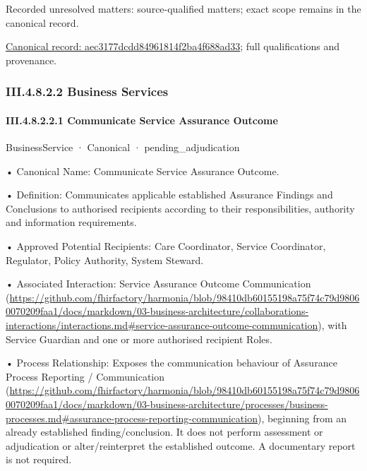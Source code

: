 {\small Recorded unresolved matters: source-qualified matters; exact scope remains in the canonical record.}\par
{\footnotesize \href{../../../../../../../../continuum/business/business-process/aec3177dcdd84961814f2ba4f688ad33.md}{Canonical record: aec3177dcdd84961814f2ba4f688ad33}; full qualifications and provenance.}\par
\subsubsection*{III.4.8.2.2 Business Services}
\label{navigation:III.4.8.2.2}

\paragraph*{III.4.8.2.2.1 Communicate Service Assurance Outcome}
\label{navigation:III.4.8.2.2.1}

\label{element:371b04d6bbf84b53a3c5667ae6df2809}
{\small BusinessService · Canonical · pending\_adjudication}\par

•
Canonical Name: Communicate Service Assurance Outcome.



•
Definition: Communicates applicable established Assurance Findings and Conclusions to authorised recipients according to their responsibilities, authority and information requirements.



•
Approved Potential Recipients: Care Coordinator, Service Coordinator, Regulator, Policy Authority, System Steward.



•
Associated Interaction: Service Assurance Outcome Communication (\url{https://github.com/fhirfactory/harmonia/blob/98410db60155198a75f74c79d98060070209faa1/docs/markdown/03-business-architecture/collaborations-interactions/interactions.md#service-assurance-outcome-communication}), with Service Guardian and one or more authorised recipient Roles.



•
Process Relationship: Exposes the communication behaviour of Assurance Process Reporting / Communication (\url{https://github.com/fhirfactory/harmonia/blob/98410db60155198a75f74c79d98060070209faa1/docs/markdown/03-business-architecture/processes/business-processes.md#assurance-process-reporting-communication}), beginning from an already established finding/conclusion. It does not perform assessment or adjudication or alter/reinterpret the established outcome. A documentary report is not required.



